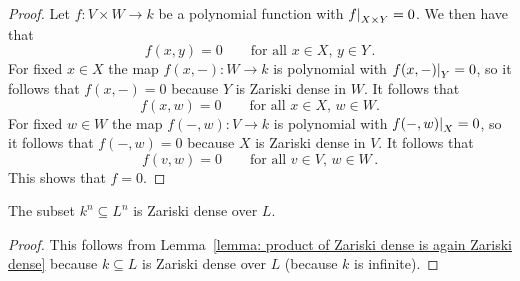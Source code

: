 \begin{proof}
  Let $f \colon V \times W \to k$ be a polynomial function with $\restrict{f}{X \times Y} = 0$.
  We then have that
  \[
      f(x,y)
    = 0
    \qquad
    \text{for all $x \in X$, $y \in Y$} \,.
  \]
  For fixed $x \in X$ the map $f(x,-) \colon W \to k$ is polynomial with $\restrict{f(x,-)}{Y} = 0$, so it follows that $f(x,-) = 0$ because $Y$ is Zariski dense in $W$.
  It follows that
  \[
      f(x,w)
    = 0
    \qquad
    \text{for all $x \in X$, $w \in W$}.
  \]
  For fixed $w \in W$ the map $f(-,w) \colon V \to k$ is polynomial with $\restrict{f(-,w)}{X} = 0$, so it follows that $f(-,w) = 0$ because $X$ is Zariski dense in $V$.
  It follows that
  \[
      f(v,w)
    = 0
    \qquad
    \text{for all $v \in V$, $w \in W$} \,.
  \]
  This shows that $f = 0$.
\end{proof}


\begin{corollary}
\label{corollary: kn is Zariski dense in Ln}
  The subset $k^n \subseteq L^n$ is Zariski dense over $L$.
\end{corollary}


\begin{proof}
  This follows from Lemma~\ref{lemma: product of Zariski dense is again Zariski dense} because $k \subseteq L$ is Zariski dense over $L$ (because $k$ is infinite).
\end{proof}



%   
%   
%   


